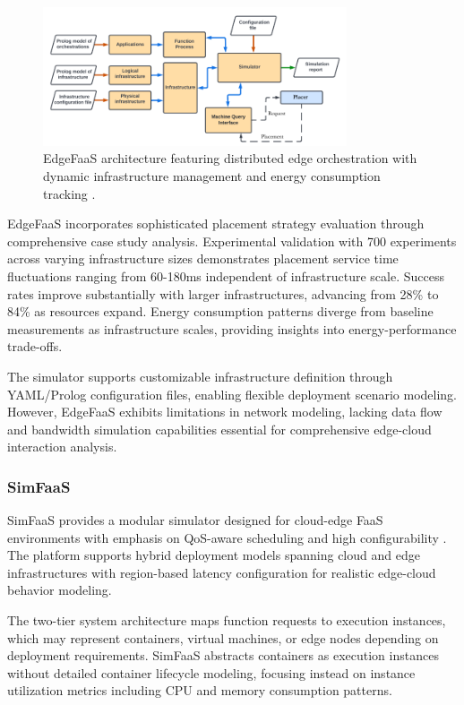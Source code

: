 \begin{figure}[htbp]
\centering
\includegraphics[width=0.8\textwidth]{assets/lambdacontsim.png}
\caption{EdgeFaaS architecture featuring distributed edge orchestration with dynamic infrastructure management and energy consumption tracking \cite{li2022edgefaas}.}
\label{fig:edgefaas-architecture}
\end{figure}


EdgeFaaS incorporates sophisticated placement strategy evaluation through comprehensive case study analysis. Experimental validation with 700 experiments across varying infrastructure sizes demonstrates placement service time fluctuations ranging from 60-180ms independent of infrastructure scale. Success rates improve substantially with larger infrastructures, advancing from 28\% to 84\% as resources expand. Energy consumption patterns diverge from baseline measurements as infrastructure scales, providing insights into energy-performance trade-offs.

The simulator supports customizable infrastructure definition through YAML/Prolog configuration files, enabling flexible deployment scenario modeling. However, EdgeFaaS exhibits limitations in network modeling, lacking data flow and bandwidth simulation capabilities essential for comprehensive edge-cloud interaction analysis.



\subsubsection{SimFaaS}

SimFaaS provides a modular simulator designed for cloud-edge FaaS environments with emphasis on QoS-aware scheduling and high configurability \cite{mahmoudi2021simfaas}. The platform supports hybrid deployment models spanning cloud and edge infrastructures with region-based latency configuration for realistic edge-cloud behavior modeling.

The two-tier system architecture maps function requests to execution instances, which may represent containers, virtual machines, or edge nodes depending on deployment requirements. SimFaaS abstracts containers as execution instances without detailed container lifecycle modeling, focusing instead on instance utilization metrics including CPU and memory consumption patterns.

